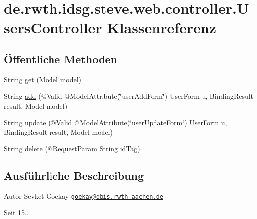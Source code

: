 \hypertarget{classde_1_1rwth_1_1idsg_1_1steve_1_1web_1_1controller_1_1_users_controller}{\section{de.\-rwth.\-idsg.\-steve.\-web.\-controller.\-Users\-Controller Klassenreferenz}
\label{classde_1_1rwth_1_1idsg_1_1steve_1_1web_1_1controller_1_1_users_controller}
}
\subsection*{Öffentliche Methoden}
\begin{DoxyCompactItemize}
\item 
String \hyperlink{classde_1_1rwth_1_1idsg_1_1steve_1_1web_1_1controller_1_1_users_controller_a13fae550e4fc58a66b29642d99ee437d}{get} (Model model)
\item 
String \hyperlink{classde_1_1rwth_1_1idsg_1_1steve_1_1web_1_1controller_1_1_users_controller_aa3c9cfeb492b520850d6c1989158b4fb}{add} (@Valid @Model\-Attribute(\char`\"{}user\-Add\-Form\char`\"{}) User\-Form u, Binding\-Result result, Model model)
\item 
String \hyperlink{classde_1_1rwth_1_1idsg_1_1steve_1_1web_1_1controller_1_1_users_controller_a69c548bbcd1a318253efe22443e38071}{update} (@Valid @Model\-Attribute(\char`\"{}user\-Update\-Form\char`\"{}) User\-Form u, Binding\-Result result, Model model)
\item 
String \hyperlink{classde_1_1rwth_1_1idsg_1_1steve_1_1web_1_1controller_1_1_users_controller_a4ba8fdf9323ccb6fb955871b12a00be5}{delete} (@Request\-Param String id\-Tag)
\end{DoxyCompactItemize}


\subsection{Ausführliche Beschreibung}
\begin{DoxyAuthor}{Autor}
Sevket Goekay \href{mailto:goekay@dbis.rwth-aachen.de}{\tt goekay@dbis.\-rwth-\/aachen.\-de} 
\end{DoxyAuthor}
\begin{DoxySince}{Seit}
15.. 
\end{DoxySince}


